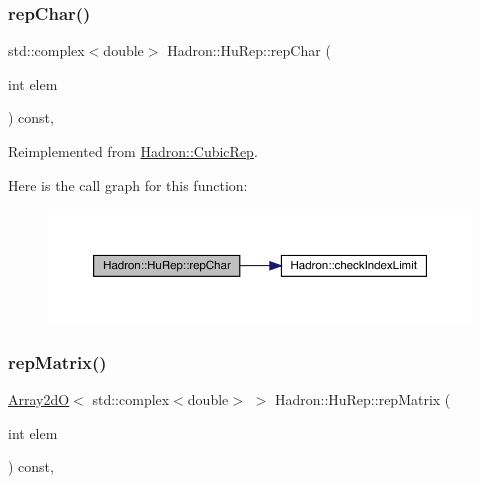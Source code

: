 \subsubsection{\texorpdfstring{repChar()}{repChar()}\hspace{0.1cm}{\footnotesize\ttfamily [2/2]}}
{\footnotesize\ttfamily std\+::complex$<$double$>$ Hadron\+::\+Hu\+Rep\+::rep\+Char (\begin{DoxyParamCaption}\item[{int}]{elem }\end{DoxyParamCaption}) const\hspace{0.3cm}{\ttfamily [inline]}, {\ttfamily [virtual]}}



Reimplemented from \mbox{\hyperlink{structHadron_1_1CubicRep_af45227106e8e715e84b0af69cd3b36f8}{Hadron\+::\+Cubic\+Rep}}.

Here is the call graph for this function\+:
\nopagebreak
\begin{figure}[H]
\begin{center}
\leavevmode
\includegraphics[width=350pt]{d9/dd4/structHadron_1_1HuRep_a764617bf3dabef7cd69ffa034e550fff_cgraph}
\end{center}
\end{figure}
\mbox{\label{structHadron_1_1HuRep_a744a3604c724067d8912075d0d8acf59}} 
\subsubsection{\texorpdfstring{repMatrix()}{repMatrix()}\hspace{0.1cm}{\footnotesize\ttfamily [1/2]}}
{\footnotesize\ttfamily \mbox{\hyperlink{classADAT_1_1Array2dO}{Array2dO}}$<$ std\+::complex$<$double$>$ $>$ Hadron\+::\+Hu\+Rep\+::rep\+Matrix (\begin{DoxyParamCaption}\item[{int}]{elem }\end{DoxyParamCaption}) const\hspace{0.3cm}{\ttfamily [inline]}, {\ttfamily [virtual]}}



